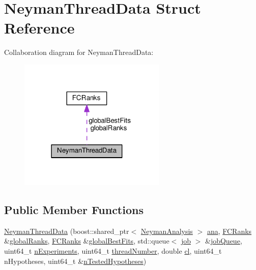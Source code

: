 \hypertarget{structNeymanThreadData}{\section{Neyman\-Thread\-Data Struct Reference}
\label{structNeymanThreadData}
}


Collaboration diagram for Neyman\-Thread\-Data\-:
\nopagebreak
\begin{figure}[H]
\begin{center}
\leavevmode
\includegraphics[width=198pt]{structNeymanThreadData__coll__graph}
\end{center}
\end{figure}
\subsection*{Public Member Functions}
\begin{DoxyCompactItemize}
\item 
\hyperlink{structNeymanThreadData_a25be57cca6f0dd8fd3a5d0e5525a35c4}{Neyman\-Thread\-Data} (boost\-::shared\-\_\-ptr$<$ \hyperlink{classNeymanAnalysis}{Neyman\-Analysis} $>$ \hyperlink{structNeymanThreadData_a4b9b47c80fd8fa5ea300485a923f2348}{ana}, \hyperlink{classFCRanks}{F\-C\-Ranks} \&\hyperlink{structNeymanThreadData_a800f5dd68444c0ec9654946105759afc}{global\-Ranks}, \hyperlink{classFCRanks}{F\-C\-Ranks} \&\hyperlink{structNeymanThreadData_a5de558380b8e1c7c08960526d91d8841}{global\-Best\-Fits}, std\-::queue$<$ \hyperlink{structjob}{job} $>$ \&\hyperlink{structNeymanThreadData_ad7e388c9438a16640110fbe9018fda90}{job\-Queue}, uint64\-\_\-t \hyperlink{structNeymanThreadData_a99154b06d67a82c8bf48112beabbd7ec}{n\-Experiments}, uint64\-\_\-t \hyperlink{structNeymanThreadData_a0d26db26796419914c2a9a35214a26b3}{thread\-Number}, double \hyperlink{structNeymanThreadData_af145feca7df9e9c5c88bec759d97ba8f}{cl}, uint64\-\_\-t n\-Hypotheses, uint64\-\_\-t \&\hyperlink{structNeymanThreadData_acab7f8af86761370c3bb06132b0e92f5}{n\-Tested\-Hypotheses})
\end{DoxyCompactItemize}
